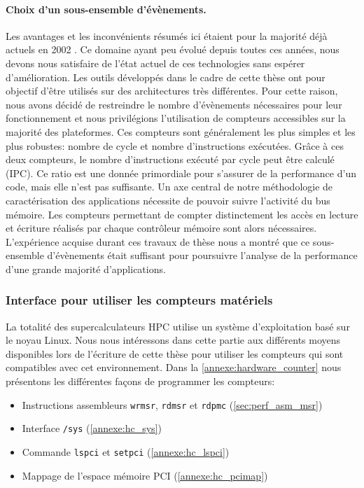     

        \paragraph{Choix d'un sous-ensemble d'évènements.} 
        
            Les avantages et les inconvénients résumés ici étaient pour la majorité déjà actuels en 2002 \cite{sprunt2002basics}. Ce domaine ayant peu évolué depuis toutes ces années, nous devons nous satisfaire de l'état actuel de ces technologies sans espérer d'amélioration. Les outils développés dans le cadre de cette thèse ont pour objectif d'être utilisés sur des architectures très différentes. Pour cette raison, nous avons décidé de restreindre le nombre d'évènements nécessaires pour leur fonctionnement et nous privilégions l'utilisation de compteurs accessibles sur la majorité des plateformes. Ces compteurs sont généralement les plus simples et les plus robustes: nombre de cycle et nombre d'instructions exécutées. Grâce à ces deux compteurs, le nombre d'instructions exécuté par cycle peut être calculé (IPC). Ce ratio est une donnée primordiale pour s'assurer de la performance d'un code, mais elle n'est pas suffisante. Un axe central de notre méthodologie de caractérisation des applications nécessite de pouvoir suivre l'activité du bus mémoire. Les compteurs permettant de compter distinctement les accès en lecture et écriture réalisés par chaque contrôleur mémoire sont alors nécessaires.
            L'expérience acquise durant ces travaux de thèse nous a montré que ce sous-ensemble d'évènements était suffisant pour poursuivre l'analyse de la performance d'une grande majorité d'applications.     

    
    \subsubsection{Interface pour utiliser les compteurs matériels} \label{sec:edl_monitoring_tools}
        
        La totalité des supercalculateurs HPC utilise un système d'exploitation basé sur le noyau Linux. Nous nous intéressons dans cette partie aux différents moyens disponibles lors de l'écriture de cette thèse pour utiliser les compteurs qui sont compatibles avec cet environnement. Dans la \autoref{annexe:hardware_counter} nous présentons les différentes façons de programmer les compteurs:
        \begin{itemize}
            \item Instructions assembleurs \verb|wrmsr|, \verb|rdmsr| et \verb|rdpmc| (\autoref{sec:perf_asm_msr})
            \item Interface \verb|/sys| (\autoref{annexe:hc_sys})
            \item Commande \verb|lspci| et \verb|setpci| (\autoref{annexe:hc_lspci})
            \item Mappage de l'espace mémoire PCI (\autoref{annexe:hc_pcimap})
        \end{itemize}
 
